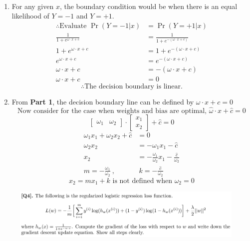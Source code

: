 \documentclass[12pt]{article}
\newenvironment{solution}[2][Solution]{\begin{trivlist}
\item[\hskip \labelsep {\bfseries #1}]}{\end{trivlist}}
\begin{document}
\begin{solution}{}~
\begin{enumerate}[label=\arabic*)]
\item For any given $x$, the boundary condition would be when there is an equal likelihood of $Y=-1$ and $Y=+1$.\\
\begin{align*}
\therefore\text{Evaluate }\Pr(Y=-1|x)&=\Pr(Y=+1|x)\\
\frac{1}{1+e^{\omega\cdot x+c}}&=\frac{1}{1+e^{-(\omega\cdot x+c)}}\\
1+e^{\omega\cdot x+c}&=1+e^{-(\omega\cdot x+c)}\\
e^{\omega\cdot x+c}&=e^{-(\omega\cdot x+c)}\\
\omega\cdot x+c&=-(\omega\cdot x+c)\\
\omega\cdot x+c&=0
\end{align*}
$$\therefore\text{The decision boundary is linear.}$$
\item From \textbf{Part 1}, the decision boundary line can be defined by $\omega\cdot x+c=0$\\

$$\text{Now consider for the case when weights and bias are optimal, }\hat\omega\cdot x+\hat c=0$$
$$
\left[\begin{matrix}
\omega_1 & \omega_2
\end{matrix}\right]\cdot\left[\begin{matrix}
x_1 \\ x_2
\end{matrix}\right]+\hat c=0
$$
\begin{align*}
\omega_1 x_1+\omega_2 x_2+\hat c&=0\\
\omega_2 x_2&=-\omega_1 x_1-\hat c\\
x_2&=-\frac{\omega_1}{\omega_2}x_1-\frac{\hat c}{\omega_2}\\
m=-\frac{\omega_1}{\omega_2}\ ,&\ k=-\frac{\hat c}{\omega_2}
\end{align*}
$$x_2=mx_1+k\text{ is not defined when }\omega_2=0$$
\end{enumerate}
\end{solution}

\begin{figure}[h!]
\includegraphics[width=\linewidth]{./assets/201805292056.png}
\end{figure}
\end{document}
